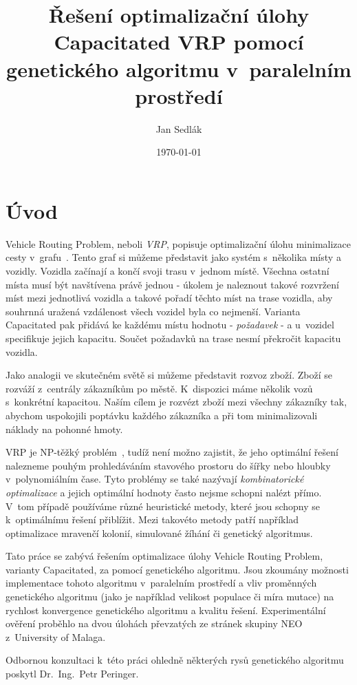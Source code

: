 \documentclass[a4paper]{article}
\title{Řešení optimalizační úlohy Capacitated VRP pomocí genetického algoritmu v~paralelním prostředí}
\author{Jan Sedlák}
\date{\today}
\begin{document}
\maketitle

\section{Úvod}

Vehicle Routing Problem, neboli \emph{VRP}, popisuje optimalizační úlohu minimalizace cesty v~grafu~\cite{dantzig}. Tento graf si můžeme představit jako systém s~několika místy a vozidly. Vozidla začínají a končí svoji trasu v~jednom místě. Všechna ostatní místa musí být navštívena právě jednou - úkolem je naleznout takové rozvržení míst mezi jednotlivá vozidla a takové pořadí těchto míst na trase vozidla, aby souhrnná uražená vzdálenost všech vozidel byla co nejmenší. Varianta Capacitated pak přidává ke každému místu hodnotu - \emph{požadavek} - a u~vozidel specifikuje jejich kapacitu. Součet požadavků na trase nesmí překročit kapacitu vozidla.

Jako analogii ve skutečném světě si můžeme představit rozvoz zboží. Zboží se rozváží z~centrály zákazníkům po městě. K~dispozici máme několik vozů s~konkrétní kapacitou. Naším cílem je rozvézt zboží mezi všechny zákazníky tak, abychom uspokojili poptávku každého zákazníka a při tom minimalizovali náklady na pohonné hmoty.

VRP je NP-těžký problém~\cite{yucenur}, tudíž není možno zajistit, že jeho optimální řešení nalezneme pouhým prohledáváním stavového prostoru do šířky nebo hloubky v~polynomiálním čase. Tyto problémy se také nazývají \emph{kombinatorické optimalizace} a jejich optimální hodnoty často nejsme schopni nalézt přímo. V~tom případě používáme různé heuristické metody, které jsou schopny se k~optimálnímu řešení přiblížit. Mezi takovéto metody patří například optimalizace mravenčí kolonií, simulované žíhání či genetický algoritmus.

Tato práce se zabývá řešením optimalizace úlohy Vehicle Routing Problem, varianty Capacitated, za pomocí genetického algoritmu. Jsou zkoumány mož\-nos\-ti implementace tohoto algoritmu v~paralelním prostředí a vliv proměnných genetického algoritmu (jako je například velikost populace či míra mutace) na rychlost konvergence genetického algoritmu a kvalitu řešení. Experimentální ověření proběhlo na dvou úlohách převzatých ze stránek skupiny NEO z~University of Malaga.

Odbornou konzultaci k~této práci ohledně některých rysů genetického algoritmu poskytl Dr.\ Ing.\ Petr Peringer.
\end{document}

